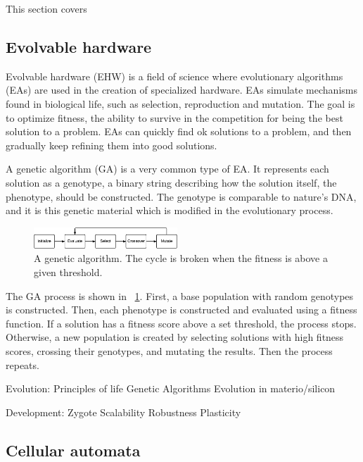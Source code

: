 This section covers \TODO

\subsection{Evolvable hardware}

Evolvable hardware (EHW) is a field of science where evolutionary algorithms (EAs) are used in the creation of specialized hardware.
EAs simulate mechanisms found in biological life, such as selection, reproduction and mutation.
The goal is to optimize fitness, the ability to survive in the competition for being the best solution to a problem.
EAs can quickly find ok solutions to a problem, and then gradually keep refining them into good solutions.

A genetic algorithm (GA) is a very common type of EA.
It represents each solution as a genotype, a binary string describing how the solution itself, the phenotype, should be constructed.
The genotype is comparable to nature's DNA, and it is this genetic material which is modified in the evolutionary process.

\begin{figure}[!ht]
    \centering
    \includegraphics[width=0.48\textwidth]{figures/ga}
    \caption{A genetic algorithm. The cycle is broken when the fitness is above a given threshold.}
    \label{fig:ga}
\end{figure}

The GA process is shown in \figurename~\ref{fig:ga}.
First, a base population with random genotypes is constructed.
Then, each phenotype is constructed and evaluated using a fitness function.
If a solution has a fitness score above a set threshold, the process stops.
Otherwise, a new population is created by selecting solutions with high fitness scores, crossing their genotypes, and mutating the results.
Then the process repeats.


Evolution:
Principles of life
Genetic Algorithms
Evolution in materio/silicon \cite{miller2014evolution}

Development:
\cite{harding2008artificial} \cite{tufte2008evodevo}
Zygote
Scalability
Robustness
Plasticity

\subsection{Cellular automata}

